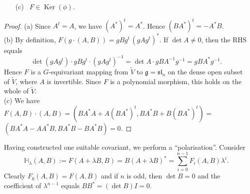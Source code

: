 \begin{ex}
\begin{lme}
\begin{itemize}
\item[\sf (c)]   \ $F\in {\operatorname{Ker}}(\phi)$.
\end{itemize}
\end{lme}
\begin{proof}   (a) Since $A^t=A$, we have $(A^*)^t=A^*$. Hence $(BA^*)^t=-A^*B$. 
\\ \indent
(b) By definition, $F(g{\cdot}(A,B))=gBg^t\,(gAg^t)^*$. If $\det A\ne 0$, then the RHS equals
\[
   \det(gAg^t){\cdot}gBg^t{\cdot}(gAg^t)^{-1}=\det A{\cdot}gBA^{-1}g^{-1}=gBA^*g^{-1} .
\] 
Hence $F$ is a $G$-equivariant mapping from $\tilde V$ to ${{\mathfrak g}}={{\mathfrak{sl}}_n}$ on the dense open subset of 
$\tilde V$, where $A$ is invertible. Since $F$ is a polynomial morphism, this holds on the whole of $\tilde V$.
\\ \indent
(c)  We have $F(A,B){\cdot}(A,B)=(BA^*A+A(BA^*)^t, BA^*B+B(BA^*)^t)=$ \\
\phantom{a} \hfill $(BA^*A-AA^*B, BA^*B-BA^*B)=0$.
\end{proof}
Having constructed one suitable covariant, we perform a ``polarisation''. Consider
\[
   \mathbb H_{\lambda}(A,B):=F(A+{\lambda} B, B)=B(A+{\lambda} B)^*=\sum_{i=0}^{n-1} F_i(A,B){\lambda}^i .
\]
Clearly $F_0(A,B)=F(A,B)$ and if $n$ is odd, then $\det B=0$ and the coefficient of ${\lambda}^{n-1}$ 
equals $BB^*=(\det B)I=0$.


\end{ex}
